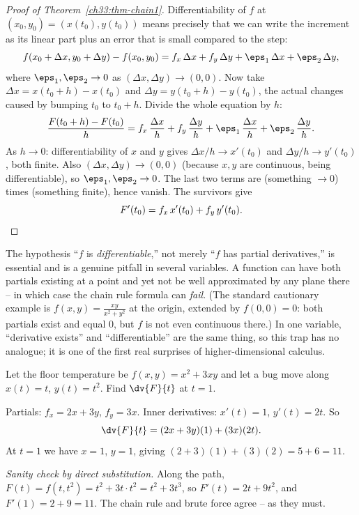 \begin{proof}[Proof of Theorem~\ref{ch33:thm-chain1}]
Differentiability of $f$ at $(x_0,y_0)=(x(t_0),y(t_0))$ means precisely that we can
write the increment as its linear part plus an error that is small compared to the
step:
\[
  f(x_0+\Delta x, y_0+\Delta y) - f(x_0,y_0)
  = f_x\,\Delta x + f_y\,\Delta y + \eps_1\,\Delta x + \eps_2\,\Delta y,
\]
where $\eps_1,\eps_2 \to 0$ as $(\Delta x,\Delta y)\to(0,0)$. Now take
$\Delta x = x(t_0+h)-x(t_0)$ and $\Delta y = y(t_0+h)-y(t_0)$, the actual changes
caused by bumping $t_0$ to $t_0+h$. Divide the whole equation by $h$:
\[
  \frac{F(t_0+h)-F(t_0)}{h}
  = f_x\,\frac{\Delta x}{h} + f_y\,\frac{\Delta y}{h}
   + \eps_1\,\frac{\Delta x}{h} + \eps_2\,\frac{\Delta y}{h}.
\]
As $h\to 0$: differentiability of $x$ and $y$ gives
$\Delta x/h \to x'(t_0)$ and $\Delta y/h \to y'(t_0)$, both finite. Also
$(\Delta x,\Delta y)\to(0,0)$ (because $x,y$ are continuous, being
differentiable), so $\eps_1,\eps_2\to 0$. The last two terms are
(something $\to 0$) times (something finite), hence vanish. The survivors give
\[
  F'(t_0) = f_x\,x'(t_0) + f_y\,y'(t_0). \qedhere
\]
\end{proof}

\begin{trapbox}
The hypothesis ``$f$ is \emph{differentiable},'' not merely ``$f$ has partial
derivatives,'' is essential and is a genuine pitfall in several variables. A
function can have both partials existing at a point and yet not be well
approximated by any plane there -- in which case the chain rule formula can
\emph{fail}. (The standard cautionary example is $f(x,y)=\tfrac{xy}{x^2+y^2}$ at
the origin, extended by $f(0,0)=0$: both partials exist and equal $0$, but $f$ is
not even continuous there.) In one variable, ``derivative exists'' and
``differentiable'' are the same thing, so this trap has no analogue; it is one of
the first real surprises of higher-dimensional calculus.
\end{trapbox}

\begin{example}
\label{ch33:ex-bug}
Let the floor temperature be $f(x,y)=x^2 + 3xy$ and let a bug move along
$x(t)=t$, $y(t)=t^2$. Find $\dv{F}{t}$ at $t=1$.

Partials: $f_x = 2x+3y$, $f_y=3x$. Inner derivatives: $x'(t)=1$, $y'(t)=2t$. So
\[
  \dv{F}{t} = (2x+3y)(1) + (3x)(2t).
\]
At $t=1$ we have $x=1$, $y=1$, giving $(2+3)(1) + (3)(2) = 5 + 6 = 11$.

\emph{Sanity check by direct substitution.} Along the path,
$F(t)=f(t,t^2)=t^2 + 3t\cdot t^2 = t^2 + 3t^3$, so $F'(t)=2t+9t^2$, and
$F'(1)=2+9=11$. The chain rule and brute force agree -- as they must.
\end{example}

